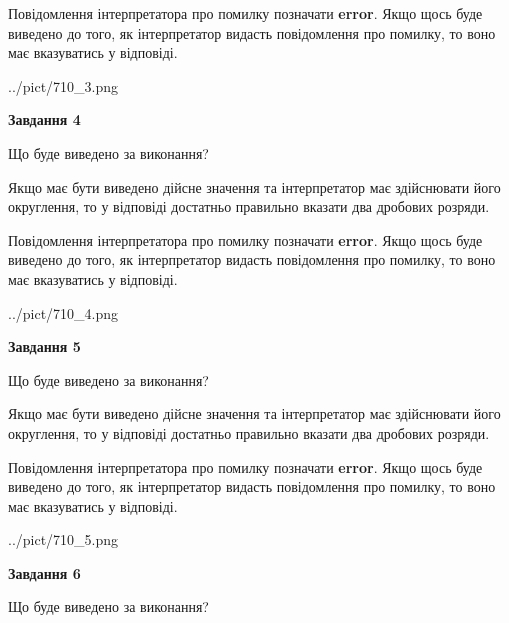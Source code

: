 \documentclass[12pt, ukrainian]{article}
\begin{document}
{\begin {Large}
Повідомлення інтерпретатора про помилку позначати \textbf{error}.
Якщо щось буде виведено до того, як інтерпретатор видасть повідомлення про помилку, 
то воно має вказуватись у відповіді. \par

\begin{center}
	{../pict/710_3.png}
\end{center}
\newpage

{\begin {center}\textbf{Завдання 4}\end {center}}\par
Що буде виведено за виконання? \par

Якщо має бути виведено дійсне значення та інтерпретатор має здійснювати його округлення, 
то у відповіді достатньо правильно вказати два дробових розряди.

Повідомлення інтерпретатора про помилку позначати \textbf{error}.
Якщо щось буде виведено до того, як інтерпретатор видасть повідомлення про помилку, 
то воно має вказуватись у відповіді. \par

\begin{center}
	{../pict/710_4.png}
\end{center}
\newpage

{\begin {center}\textbf{Завдання 5}\end {center}}\par
Що буде виведено за виконання? \par

Якщо має бути виведено дійсне значення та інтерпретатор має здійснювати його округлення, 
то у відповіді достатньо правильно вказати два дробових розряди.

Повідомлення інтерпретатора про помилку позначати \textbf{error}.
Якщо щось буде виведено до того, як інтерпретатор видасть повідомлення про помилку, 
то воно має вказуватись у відповіді. \par

\begin{center}
	{../pict/710_5.png}
\end{center}
\newpage

{\begin {center}\textbf{Завдання 6}\end {center}}\par
Що буде виведено за виконання? \par


\end{Large}}
\end{document}
